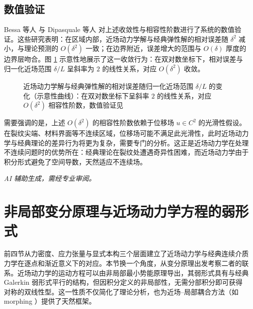\subsection{数值验证}
\label{subsec:numerical-verify}

Bessa 等人 \cite{Bessa2014} 与 Dipasquale 等人 \cite{Dipasquale2014} 对上述收敛性与相容性阶数进行了系统的数值验证。这些研究表明：在区域内部，近场动力学解与经典弹性解的相对误差随 $\delta^2$ 减小，与理论预测的 $O(\delta^2)$ 一致；在边界附近，误差增大的范围与 $O(\delta)$ 厚度的边界层吻合。图 \ref{fig:convergence-curve} 示意性地展示了这一收敛行为：在双对数坐标下，相对误差与归一化近场范围 $\delta/L$ 呈斜率为 $2$ 的线性关系，对应 $O(\delta^2)$ 收敛。

\begin{figure}[htbp]
\centering
{}
\caption{近场动力学解与经典弹性解的相对误差随归一化近场范围 $\delta/L$ 的变化（示意性曲线）：在双对数坐标下呈斜率 $2$ 的线性关系，对应 $O(\delta^2)$ 相容性阶数，数值验证见 \cite{Bessa2014,Dipasquale2014}}
\label{fig:convergence-curve}
\end{figure}

需要强调的是，上述 $O(\delta^2)$ 的相容性阶数依赖于位移场 $u\in C^2$ 的光滑性假设。在裂纹尖端、材料界面等不连续区域，位移场可能不满足此光滑性，此时近场动力学与经典理论的差异行为将更为复杂，需要专门的分析。这正是近场动力学在处理不连续问题时的优势所在：经典理论在裂纹处遭遇奇异性困难，而近场动力学由于积分形式避免了空间导数，天然适应不连续场。

\emph{AI 辅助生成，需经专业审阅。}

\section{非局部变分原理与近场动力学方程的弱形式}
\label{sec:nonlocal-variational}

前四节从力密度、应力张量与显式本构三个层面建立了近场动力学与经典连续介质力学在逐点和渐近意义下的对应。本节换一个角度，从变分原理出发考察二者的联系。近场动力学的运动方程可以由非局部最小势能原理导出，其弱形式具有与经典 Galerkin 弱形式平行的结构，但因积分定义的非局部性，无需分部积分即可获得对称的双线性型。这一性质不仅简化了理论分析，也为近场--局部耦合方法（如 morphing \cite{Lubineau2012}）提供了天然框架。

